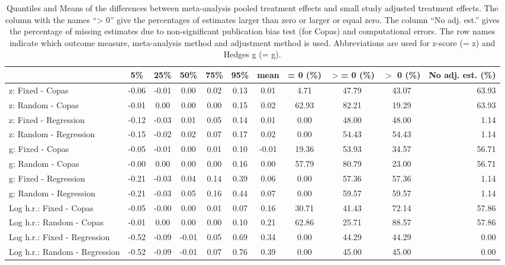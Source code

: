 \documentclass[11pt,a4paper,twoside]{book}\usepackage[]{graphicx}\usepackage[]{color}
\begin{document}
\begin{table}[ht]
\centering
\begingroup\scriptsize
\begin{tabular}{lcccccccccr}
  \hline
 & 5\% & 25\% & 50\% & 75\% & 95\% & mean & = 0 (\%) & $>$= 0 (\%) & $>$ 0 (\%) & No adj. est. (\%) \\ 
  \hline
z: Fixed - Copas & -0.06 & -0.01 & 0.00 & 0.02 & 0.13 & 0.01 & 4.71 & 47.79 & 43.07 & 63.93 \\ 
  z: Random - Copas & -0.01 & 0.00 & 0.00 & 0.00 & 0.15 & 0.02 & 62.93 & 82.21 & 19.29 & 63.93 \\ 
  z: Fixed - Regression & -0.12 & -0.03 & 0.01 & 0.05 & 0.14 & 0.01 & 0.00 & 48.00 & 48.00 & 1.14 \\ 
  z: Random - Regression & -0.15 & -0.02 & 0.02 & 0.07 & 0.17 & 0.02 & 0.00 & 54.43 & 54.43 & 1.14 \\ 
  g: Fixed - Copas & -0.05 & -0.01 & 0.00 & 0.01 & 0.10 & -0.01 & 19.36 & 53.93 & 34.57 & 56.71 \\ 
  g: Random - Copas & -0.00 & 0.00 & 0.00 & 0.00 & 0.16 & 0.00 & 57.79 & 80.79 & 23.00 & 56.71 \\ 
  g: Fixed - Regression & -0.21 & -0.03 & 0.04 & 0.14 & 0.39 & 0.06 & 0.00 & 57.36 & 57.36 & 1.14 \\ 
  g: Random - Regression & -0.21 & -0.03 & 0.05 & 0.16 & 0.44 & 0.07 & 0.00 & 59.57 & 59.57 & 1.14 \\ 
  Log h.r.: Fixed - Copas & -0.05 & -0.00 & 0.00 & 0.01 & 0.07 & 0.16 & 30.71 & 41.43 & 72.14 & 57.86 \\ 
  Log h.r.: Random - Copas & -0.01 & 0.00 & 0.00 & 0.00 & 0.10 & 0.21 & 62.86 & 25.71 & 88.57 & 57.86 \\ 
  Log h.r.: Fixed - Regression & -0.52 & -0.09 & -0.01 & 0.05 & 0.69 & 0.34 & 0.00 & 44.29 & 44.29 & 0.00 \\ 
  Log h.r.: Random - Regression & -0.52 & -0.09 & -0.01 & 0.07 & 0.76 & 0.39 & 0.00 & 45.00 & 45.00 & 0.00 \\ 
   \hline
\end{tabular}
\endgroup
\caption{Quantiles and Means of the differences between meta-analysis pooled treatment effects and small study adjusted treatment effects. The column with the names ``> 0'' give the percentages of estimates larger than zero or larger or equal zero. The column ``No adj. est.'' gives the percentage of missing estimates due to non-significant publication bias test (for Copas) and computational errors. The row names indicate which outcome measure, meta-analysis method and adjustment method is used. Abbreviations are used for z-score (= z) and Hedges g (= g).} 
\label{adjustment.difference}
\end{table}
\end{document}
